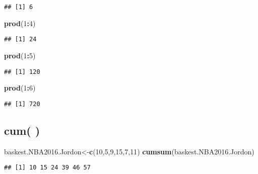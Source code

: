 \documentclass[]{article}
\newenvironment{Shaded}{\begin{snugshade}}{\end{snugshade}}
\newcommand{\DecValTok}[1]{\textcolor[rgb]{0.00,0.00,0.81}{#1}}
\newcommand{\KeywordTok}[1]{\textcolor[rgb]{0.13,0.29,0.53}{\textbf{#1}}}
\newcommand{\NormalTok}[1]{#1}
\newcommand{\OperatorTok}[1]{\textcolor[rgb]{0.81,0.36,0.00}{\textbf{#1}}}
\begin{document}
\begin{verbatim}
## [1] 6
\end{verbatim}

\begin{Shaded}
\begin{Highlighting}[]
\KeywordTok{prod}\NormalTok{(}\DecValTok{1}\OperatorTok{:}\DecValTok{4}\NormalTok{)}
\end{Highlighting}
\end{Shaded}

\begin{verbatim}
## [1] 24
\end{verbatim}

\begin{Shaded}
\begin{Highlighting}[]
\KeywordTok{prod}\NormalTok{(}\DecValTok{1}\OperatorTok{:}\DecValTok{5}\NormalTok{)}
\end{Highlighting}
\end{Shaded}

\begin{verbatim}
## [1] 120
\end{verbatim}

\begin{Shaded}
\begin{Highlighting}[]
\KeywordTok{prod}\NormalTok{(}\DecValTok{1}\OperatorTok{:}\DecValTok{6}\NormalTok{)}
\end{Highlighting}
\end{Shaded}

\begin{verbatim}
## [1] 720
\end{verbatim}

\hypertarget{cum}{%
\subsection{cum( )}\label{cum}}

\begin{Shaded}
\begin{Highlighting}[]
\NormalTok{baskest.NBA2016.Jordon<-}\KeywordTok{c}\NormalTok{(}\DecValTok{10}\NormalTok{,}\DecValTok{5}\NormalTok{,}\DecValTok{9}\NormalTok{,}\DecValTok{15}\NormalTok{,}\DecValTok{7}\NormalTok{,}\DecValTok{11}\NormalTok{)}
\KeywordTok{cumsum}\NormalTok{(baskest.NBA2016.Jordon)}
\end{Highlighting}
\end{Shaded}

\begin{verbatim}
## [1] 10 15 24 39 46 57
\end{verbatim}
\end{document}
